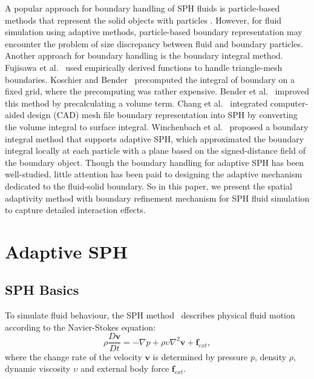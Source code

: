 \documentclass[VANCOUVER,STIX1COL]{WileyNJD-v2}
\begin{document}
A popular approach for boundary handling of SPH fluids is particle-based methods that represent the solid objects with particles \cite{Akinci12, Band18b}. However, for fluid simulation using adaptive methods, particle-based boundary representation may encounter the problem of size discrepancy between fluid and boundary particles. Another approach for boundary handling is the boundary integral method. Fujisawa et al.~\cite{Fujisawa15} used empirically derived functions to handle triangle-mesh boundaries. Koschier and Bender~\cite{Koschier17} precomputed the integral of boundary on a fixed grid, where the precomputing was rather expensive. Bender et al.~\cite{Bender19} improved this method by precalculating a volume term. Chang et al.~\cite{Chang20} integrated computer-aided design (CAD) mesh file boundary representation into SPH by converting the volume integral to surface integral. Winchenbach et al.~\cite{Winchenbach20} proposed a boundary integral method that supports adaptive SPH, which approximated the boundary integral locally at each particle with a plane based on the signed-distance field of the boundary object. Though the boundary handling for adaptive SPH has been well-studied, little attention has been paid to designing the adaptive mechanism dedicated to the fluid-solid boundary. So in this paper, we present the spatial adaptivity method with boundary refinement mechanism for SPH fluid simulation to capture detailed interaction effects.

\section{Adaptive SPH}

\subsection{SPH Basics}

To simulate fluid behaviour, the SPH method~\cite{Koschier19} describes physical fluid motion according to the Navier-Stokes equation:
\begin{equation}
    \rho \frac{D\mathbf{v}}{Dt}=-\nabla p + \rho \upsilon \nabla^2 \mathbf{v} + \mathbf{f}_{ext},
\label{equ-2}
\end{equation}
where the change rate of the velocity $\mathbf{v}$ is determined by pressure $p$, density $\rho$, dynamic viscosity $\upsilon$ and external body force $\mathbf{f}_{ext}$.
\end{document}

